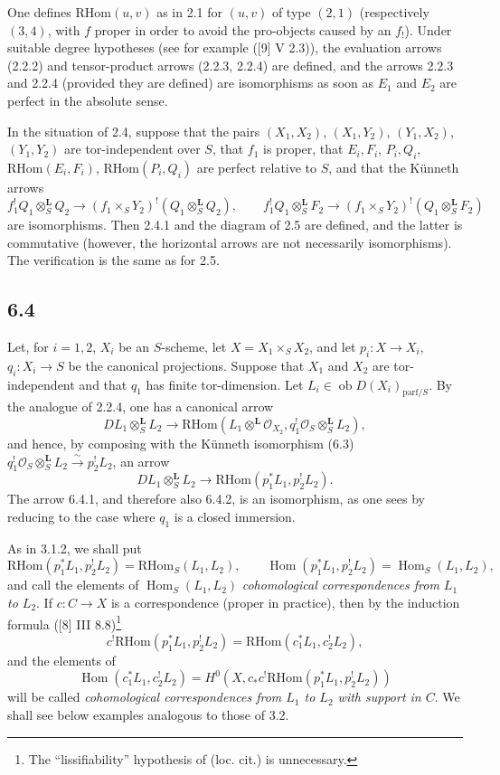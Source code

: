 \documentclass[11pt]{article}
\providecommand{\cO}{\mathcal{O}}
\DeclareMathOperator{\Hom}{Hom}
\providecommand{\RHom}{\mathrm{RHom}}
\providecommand{\RHom}{\mathrm{RHom}}
\providecommand{\Hom}{\operatorname{Hom}}
\providecommand{\RHom}{\mathrm R\mathcal{H}om}
\providecommand{\RHom}{\mathrm{RHom}}
\begin{document}
One defines $\RHom(u,v)$ as in 2.1 for $(u,v)$ of type $(2,1)$ (respectively $(3,4)$, with $f$ proper in order to avoid the pro-objects caused by an $f_!$). Under suitable degree hypotheses (see for example ([9] V 2.3)), the evaluation arrows (2.2.2) and tensor-product arrows (2.2.3, 2.2.4) are defined, and the arrows 2.2.3 and 2.2.4 (provided they are defined) are isomorphisms as soon as $E_1$ and $E_2$ are perfect in the absolute sense.

In the situation of 2.4, suppose that the pairs $(X_1,X_2)$, $(X_1,Y_2)$, $(Y_1,X_2)$, $(Y_1,Y_2)$ are tor-independent over $S$, that $f_1$ is proper, that $E_i,F_i$, $P_i,Q_i$, $\RHom(E_i,F_i)$, $\RHom(P_i,Q_i)$ are perfect relative to $S$, and that the Künneth arrows
\[
f_1^!Q_1\otimes_S^{\mathbf L}Q_2\to(f_1\times_SY_2)^!(Q_1\otimes_S^{\mathbf L}Q_2),\qquad
f_1^!Q_1\otimes_S^{\mathbf L}F_2\to(f_1\times_SY_2)^!(Q_1\otimes_S^{\mathbf L}F_2)
\]
are isomorphisms. Then 2.4.1 and the diagram of 2.5 are defined, and the latter is commutative (however, the horizontal arrows are not necessarily isomorphisms). The verification is the same as for 2.5.

\subsection*{6.4}
Let, for $i=1,2$, $X_i$ be an $S$-scheme, let $X=X_1\times_SX_2$, and let $p_i:X\to X_i$, $q_i:X_i\to S$ be the canonical projections. Suppose that $X_1$ and $X_2$ are tor-independent and that $q_1$ has finite tor-dimension. Let $L_i\in\operatorname{ob}D(X_i)_{\mathrm{parf}/S}$. By the analogue of 2.2.4, one has a canonical arrow
\begin{equation}
\tag{6.4.1}
DL_1\otimes_S^{\mathbf L}L_2\longrightarrow \RHom(L_1\otimes^{\mathbf L}\cO_{X_2},q_1^!\cO_S\otimes_S^{\mathbf L}L_2),
\end{equation}
and hence, by composing with the Künneth isomorphism (6.3) $q_1^!\cO_S\otimes_S^{\mathbf L}L_2\xrightarrow{\sim}p_2^!L_2$, an arrow
\begin{equation}
\tag{6.4.2}
DL_1\otimes_S^{\mathbf L}L_2\longrightarrow\RHom(p_1^*L_1,p_2^!L_2).
\end{equation}
The arrow 6.4.1, and therefore also 6.4.2, is an isomorphism, as one sees by reducing to the case where $q_1$ is a closed immersion.

As in 3.1.2, we shall put
\begin{equation}
\tag{6.4.3}
\RHom(p_1^*L_1,p_2^!L_2)=\RHom_S(L_1,L_2),\qquad
\Hom(p_1^*L_1,p_2^!L_2)=\Hom_S(L_1,L_2),
\end{equation}
and call the elements of $\Hom_S(L_1,L_2)$ \emph{cohomological correspondences from $L_1$ to $L_2$}. If $c:C\to X$ is a correspondence (proper in practice), then by the induction formula ([8] III 8.8)\footnote{The ``lissifiability'' hypothesis of (loc. cit.) is unnecessary.}
\begin{equation}
\tag{6.4.4}
c^!\RHom(p_1^*L_1,p_2^!L_2)=\RHom(c_1^*L_1,c_2^!L_2),
\end{equation}
and the elements of
\[
\Hom(c_1^*L_1,c_2^!L_2)=H^0(X,c_*c^!\RHom(p_1^*L_1,p_2^!L_2))
\]
will be called \emph{cohomological correspondences from $L_1$ to $L_2$ with support in $C$}. We shall see below examples analogous to those of 3.2.
\end{document}
